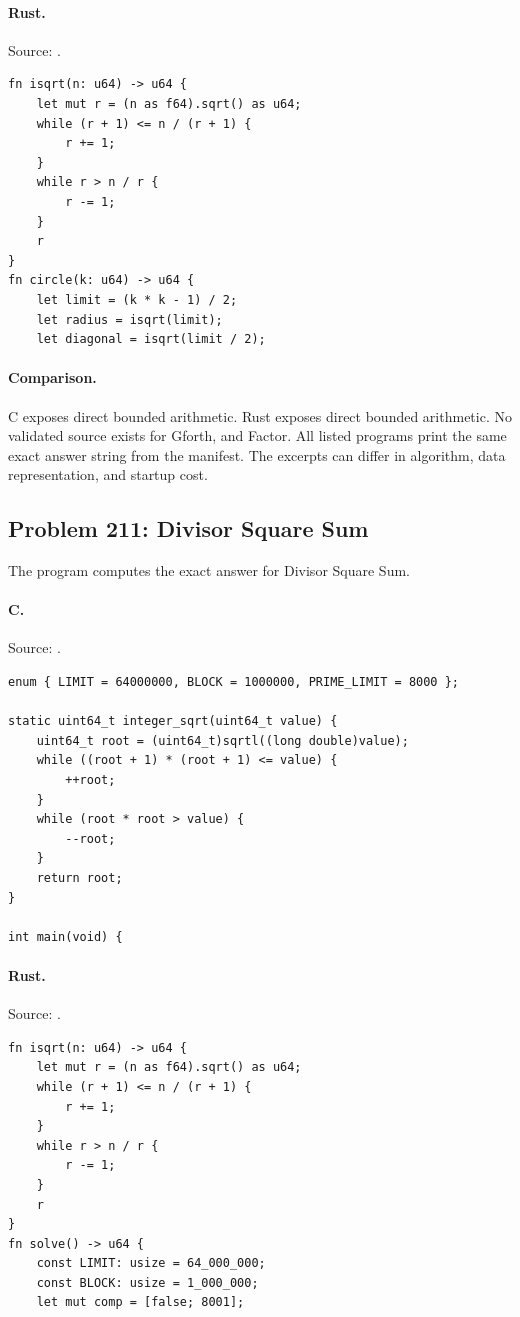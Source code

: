 \paragraph{Rust.} Source: .
\begin{lstlisting}
fn isqrt(n: u64) -> u64 {
    let mut r = (n as f64).sqrt() as u64;
    while (r + 1) <= n / (r + 1) {
        r += 1;
    }
    while r > n / r {
        r -= 1;
    }
    r
}
fn circle(k: u64) -> u64 {
    let limit = (k * k - 1) / 2;
    let radius = isqrt(limit);
    let diagonal = isqrt(limit / 2);
\end{lstlisting}

\paragraph{Comparison.}
C exposes direct bounded arithmetic. Rust exposes direct bounded arithmetic.
No validated source exists for Gforth, and Factor.
All listed programs print the same exact answer string from the manifest. The excerpts can differ in algorithm, data representation, and startup cost.

\subsection{Problem 211: Divisor Square Sum}
\label{walkthrough:p211}
The program computes the exact answer for Divisor Square Sum.

\paragraph{C.} Source: .
\begin{lstlisting}
enum { LIMIT = 64000000, BLOCK = 1000000, PRIME_LIMIT = 8000 };

static uint64_t integer_sqrt(uint64_t value) {
    uint64_t root = (uint64_t)sqrtl((long double)value);
    while ((root + 1) * (root + 1) <= value) {
        ++root;
    }
    while (root * root > value) {
        --root;
    }
    return root;
}

int main(void) {
\end{lstlisting}

\paragraph{Rust.} Source: .
\begin{lstlisting}
fn isqrt(n: u64) -> u64 {
    let mut r = (n as f64).sqrt() as u64;
    while (r + 1) <= n / (r + 1) {
        r += 1;
    }
    while r > n / r {
        r -= 1;
    }
    r
}
fn solve() -> u64 {
    const LIMIT: usize = 64_000_000;
    const BLOCK: usize = 1_000_000;
    let mut comp = [false; 8001];
\end{lstlisting}

